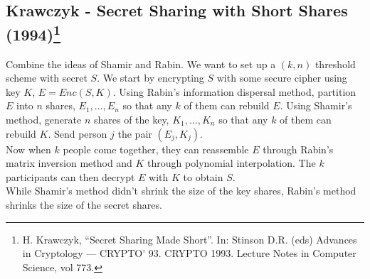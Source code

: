 \documentclass[12pt]{article}
\begin{document}
\subsection*{Krawczyk - Secret Sharing with Short Shares (1994)\footnote{H. Krawczyk, ``Secret Sharing Made Short''. In: Stinson D.R. (eds) Advances in Cryptology — CRYPTO’ 93. CRYPTO 1993. Lecture Notes in Computer Science, vol 773.}}
Combine the ideas of Shamir and Rabin. We want to set up a $(k,n)$ threshold scheme with secret $S$. We start by encrypting $S$ with some secure cipher using key $K$, $E = Enc(S, K)$. Using Rabin's information dispersal method, partition $E$ into $n$ shares, $E_1, \ldots, E_n$ so that any $k$ of them can rebuild $E$. Using Shamir's method, generate $n$ shares of the key, $K_1, \ldots, K_n$ so that any $k$ of them can rebuild $K$. Send person $j$ the pair $(E_j, K_j)$.\\

\noindent Now when $k$ people come together, they can reassemble $E$ through Rabin's matrix inversion method and $K$ through polynomial interpolation. The $k$ participants can then decrypt $E$ with $K$ to obtain $S$.\\

\noindent While Shamir's method didn't shrink the size of the key shares, Rabin's method shrinks the size of the secret shares.



\end{document}

